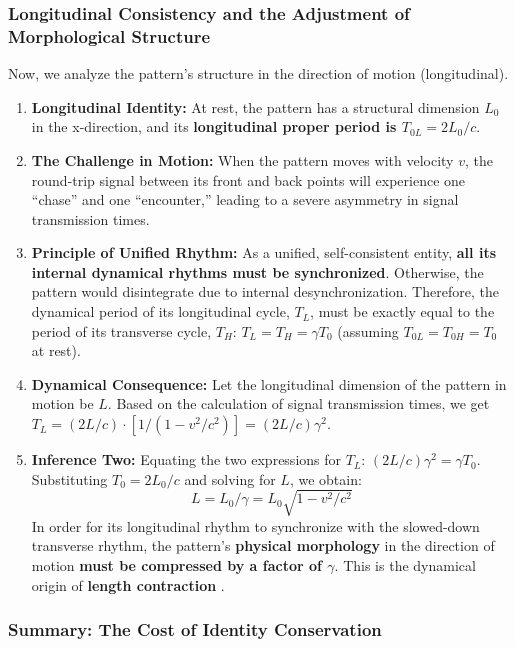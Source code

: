\documentclass[11pt, a4paper]{article}
\begin{document}
\subsubsection{Longitudinal Consistency and the Adjustment of Morphological Structure}

Now, we analyze the pattern's structure in the direction of motion (longitudinal).

\begin{enumerate}
    \item \textbf{Longitudinal Identity:} At rest, the pattern has a structural dimension $L_0$ in the x-direction, and its \textbf{longitudinal proper period is $T_{0L} = 2L_0 / c$}.
    \item \textbf{The Challenge in Motion:} When the pattern moves with velocity $v$, the round-trip signal between its front and back points will experience one ``chase'' and one ``encounter,'' leading to a severe asymmetry in signal transmission times.
    \item \textbf{Principle of Unified Rhythm:} As a unified, self-consistent entity, \textbf{all its internal dynamical rhythms must be synchronized}. Otherwise, the pattern would disintegrate due to internal desynchronization. Therefore, the dynamical period of its longitudinal cycle, $T_L$, must be exactly equal to the period of its transverse cycle, $T_H$: $T_L = T_H = \gamma T_0$ (assuming $T_{0L} = T_{0H} = T_0$ at rest).
    \item \textbf{Dynamical Consequence:} Let the longitudinal dimension of the pattern in motion be $L$. Based on the calculation of signal transmission times, we get $T_L = (2L/c) \cdot [1 / (1 - v^2/c^2)] = (2L/c) \gamma^2$.
    \item \textbf{Inference Two:} Equating the two expressions for $T_L$: $(2L/c) \gamma^2 = \gamma T_0$. Substituting $T_0=2L_0/c$ and solving for $L$, we obtain:
    \[
    L = L_0 / \gamma = L_0 \sqrt{1 - v^2/c^2}
    \]
    In order for its longitudinal rhythm to synchronize with the slowed-down transverse rhythm, the pattern's \textbf{physical morphology} in the direction of motion \textbf{must be compressed by a factor of $\gamma$}. This is the dynamical origin of \textbf{length contraction} \cite{Einstein1905}.
\end{enumerate}

\subsubsection{Summary: The Cost of Identity Conservation}
\end{document}

